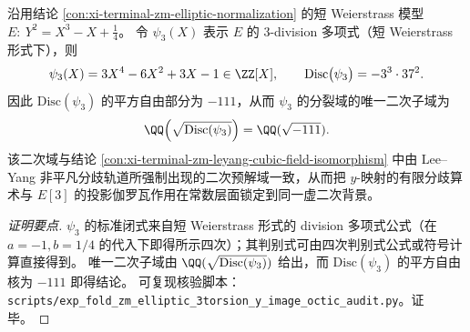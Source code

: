 \begin{conclusion}\label{con:xi-terminal-zm-elliptic-3division-discriminant}
沿用结论 \ref{con:xi-terminal-zm-elliptic-normalization} 的短 Weierstrass 模型
\(
E:\ Y^{2}=X^{3}-X+\tfrac14
\)。
令 \(\psi_{3}(X)\) 表示 \(E\) 的 \(3\)-division 多项式（短 Weierstrass 形式下），则
\[
\psi_{3}(X)=3X^{4}-6X^{2}+3X-1\in\ZZ[X],
\qquad
\mathrm{Disc}\bigl(\psi_{3}\bigr)=-3^{3}\cdot 37^{2}.
\]
因此 \(\mathrm{Disc}(\psi_3)\) 的平方自由部分为 \(-111\)，从而 \(\psi_3\) 的分裂域的唯一二次子域为
\[
\QQ\!\left(\sqrt{\mathrm{Disc}(\psi_3)}\right)=\QQ(\sqrt{-111}).
\]
该二次域与结论 \ref{con:xi-terminal-zm-leyang-cubic-field-isomorphism} 中由 Lee--Yang 非平凡分歧轨道所强制出现的二次预解域一致，从而把 \(y\)-映射的有限分歧算术与 \(E[3]\) 的投影伽罗瓦作用在常数层面锁定到同一虚二次背景。
\end{conclusion}
\begin{proof}[证明要点]
\(\psi_3\) 的标准闭式来自短 Weierstrass 形式的 division 多项式公式（在 \(a=-1,b=1/4\) 的代入下即得所示四次）；其判别式可由四次判别式公式或符号计算直接得到。
唯一二次子域由 \(\QQ(\sqrt{\mathrm{Disc}(\psi_3)})\) 给出，而 \(\mathrm{Disc}(\psi_3)\) 的平方自由核为 \(-111\) 即得结论。
可复现核验脚本：\texttt{scripts/exp\_fold\_zm\_elliptic\_3torsion\_y\_image\_octic\_audit.py}。证毕。
\end{proof}

